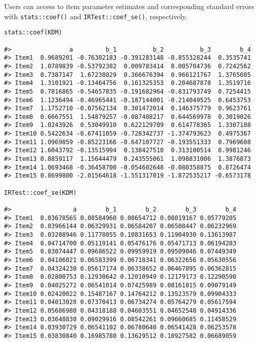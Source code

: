 Users can access to item parameter estimates and corresponding standard
errors with \texttt{stats::coef()} and \texttt{IRTest::coef\_se()}, respectively.

\begin{verbatim}
stats::coef(KDM)

#>                a         b_1          b_2          b_3        b_4
#> Item1  0.9689201 -0.76302183 -0.391283148 -0.855328244  0.3535741
#> Item2  1.0789839 -0.53792382  0.009783414  0.005704736  0.7242562
#> Item3  0.7387147  1.67238829  0.366676394  0.966121767  1.3765605
#> Item4  1.3101921 -0.13464756  0.161325353  0.204687878  1.3519716
#> Item5  0.7816865 -0.54657035 -0.191682964 -0.831793749  0.7254415
#> Item6  1.1236494 -0.46965441 -0.187144001 -0.214049525  0.6453753
#> Item7  1.1752710 -0.07562134  0.301472014  0.146375779  0.9623761
#> Item8  0.6667551  1.54879257 -0.087408217  0.644569978  0.3019026
#> Item9  1.0243926  0.53049910  0.622129709  0.614778365  1.3307188
#> Item10 0.5422634 -0.67411059 -0.728342737 -1.374793623  0.4975367
#> Item11 1.0969859 -0.85223166 -0.647107727 -0.193551333  0.7969608
#> Item12 1.6043792 -0.13515994  0.138427510  0.313100514  0.9981246
#> Item13 0.8859117  1.15644479  0.243555061  1.098831006  1.3876873
#> Item14 1.0693468 -0.36458700 -0.054602648 -0.080358875  0.8726474
#> Item15 0.8699800 -2.01564618 -1.551317019 -1.872535217 -0.6573178

IRTest::coef_se(KDM)

#>                 a        b_1        b_2        b_3        b_4
#> Item1  0.03678565 0.08584960 0.08654712 0.08019167 0.05779205
#> Item2  0.03966144 0.06329931 0.06584207 0.06508447 0.06232969
#> Item3  0.03208946 0.11778055 0.10831653 0.11904930 0.13613987
#> Item4  0.04714700 0.05119141 0.05476176 0.05471713 0.06194283
#> Item5  0.03074447 0.09686522 0.09959919 0.09509046 0.07449349
#> Item6  0.04106021 0.06583399 0.06718341 0.06322656 0.05630556
#> Item7  0.04324230 0.05617174 0.06338652 0.06467895 0.06362815
#> Item8  0.02800753 0.12930642 0.12010949 0.12179173 0.12290590
#> Item9  0.04025272 0.06541014 0.07425989 0.08161815 0.09079149
#> Item10 0.02420022 0.15487167 0.14764212 0.13523579 0.09904333
#> Item11 0.04013028 0.07370413 0.06734274 0.05764279 0.05617594
#> Item12 0.05686980 0.04318188 0.04603551 0.04652548 0.04914336
#> Item13 0.03648830 0.09029916 0.08542261 0.09660685 0.11458529
#> Item14 0.03930729 0.06541102 0.06780640 0.06541428 0.06253578
#> Item15 0.03830840 0.16985780 0.13629512 0.10927582 0.06689059
\end{verbatim}

